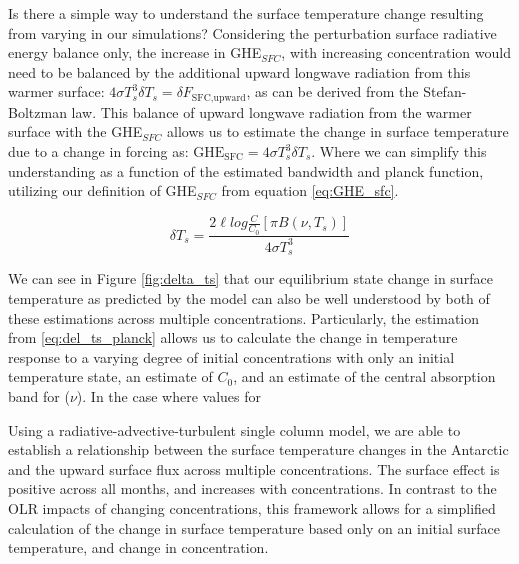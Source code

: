 \documentclass[draft]{agujournal2019}
\begin{document}
Is there a simple way to understand the surface temperature change resulting from varying  in our simulations? Considering the perturbation surface radiative energy balance only, the increase in GHE$_{SFC}$, with increasing  concentration would need to be balanced by the additional upward longwave radiation from this warmer surface: $ 4 \sigma T_s^3 \delta T_s = \delta F_{\text{SFC}, \text{upward}}$, as can be derived from the Stefan-Boltzman law. This balance of upward longwave radiation from the warmer surface with the GHE$_{SFC}$ allows us to estimate the change in surface temperature due to a change in  forcing as: $\text{GHE}_{\text{SFC}} = 4 \sigma T_s^3 \delta T_s$. Where we can simplify this understanding as a function of the estimated bandwidth and planck function, utilizing our definition of GHE$_{SFC}$ from equation \ref{eq:GHE_sfc}.

\begin{equation}\label{eq:del_ts_planck}
    \delta T_s = \frac{2\ell log\frac{C}{C_0} [\pi B(\nu, T_s)]}{4\sigma T_s^3}
\end{equation}

We can see in Figure \ref{fig:delta_ts} that our equilibrium state change in surface temperature as predicted by the model can also be well understood by both of these estimations across multiple  concentrations. Particularly, the estimation from \ref{eq:del_ts_planck} allows us to calculate the change in temperature response to a varying degree of initial  concentrations with only an initial temperature state, an estimate of $C_0$, and an estimate of the central absorption band for  ($\nu$). In the case where values for 

Using a radiative-advective-turbulent single column model, we are able to establish a relationship between the surface temperature changes in the Antarctic and the upward surface flux across multiple  concentrations. The  surface effect is positive across all months, and increases with  concentrations. In contrast to the OLR impacts of changing  concentrations, this framework allows for a simplified calculation of the change in surface temperature based only on an initial surface temperature, and change in  concentration. 
\end{document}
